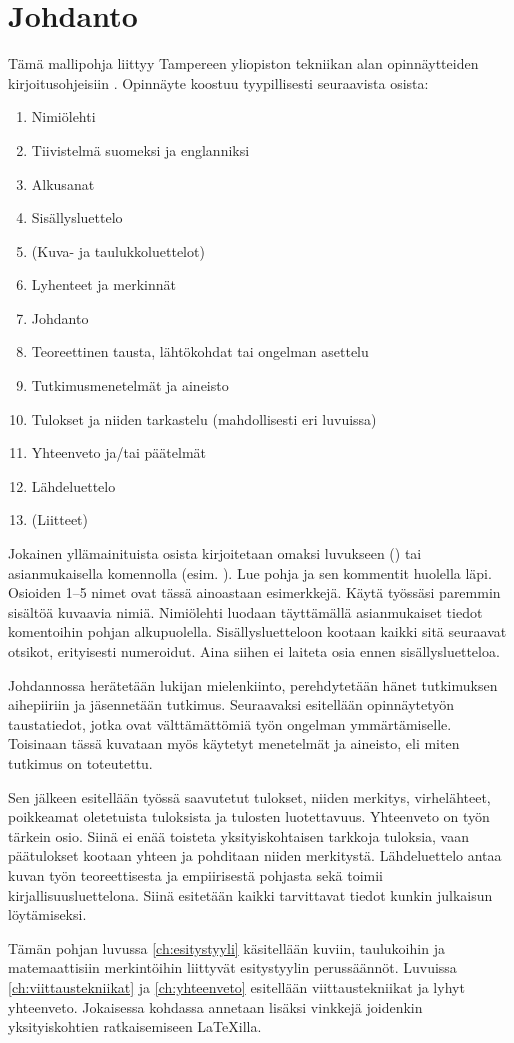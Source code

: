 \chapter{Johdanto}%
\label{ch:johdanto}

Tämä mallipohja liittyy Tampereen yliopiston tekniikan alan opinnäytteiden kirjoitusohjeisiin \parencite{kirjoitusohje2018}. Opinnäyte koostuu tyypillisesti seuraavista osista:

\begin{enumerate}
    \item[] Nimiölehti
    \item[] Tiivistelmä suomeksi ja englanniksi
    \item[] Alkusanat
    \item[] Sisällysluettelo
    \item[] (Kuva- ja taulukkoluettelot)
    \item[] Lyhenteet ja merkinnät
    \item Johdanto
    \item Teoreettinen tausta, lähtökohdat tai ongelman asettelu
    \item Tutkimusmenetelmät ja aineisto
    \item Tulokset ja niiden tarkastelu (mahdollisesti eri luvuissa)
    \item Yhteenveto ja/tai päätelmät
    \item[] Lähdeluettelo
    \item[] (Liitteet)
\end{enumerate}

Jokainen yllämainituista osista kirjoitetaan omaksi luvukseen () tai asianmukaisella komennolla (esim. ). Lue pohja ja sen kommentit huolella läpi. Osioiden 1--5 nimet ovat tässä ainoastaan esimerkkejä. Käytä työssäsi paremmin sisältöä kuvaavia nimiä. Nimiölehti luodaan täyttämällä asianmukaiset tiedot komentoihin pohjan alkupuolella. Sisällysluetteloon kootaan kaikki sitä seuraavat otsikot, erityisesti numeroidut. Aina siihen ei laiteta osia ennen sisällysluetteloa.

Johdannossa herätetään lukijan mielenkiinto, perehdytetään hänet tutkimuksen aihepiiriin ja jäsennetään tutkimus. Seuraavaksi esitellään opinnäytetyön taustatiedot, jotka ovat välttämättömiä työn ongelman ymmärtämiselle. Toisinaan tässä kuvataan myös käytetyt menetelmät ja aineisto, eli miten tutkimus on toteutettu.

Sen jälkeen esitellään työssä saavutetut tulokset, niiden merkitys, virhelähteet, poikkeamat oletetuista tuloksista ja tulosten luotettavuus. Yhteenveto on työn tärkein osio. Siinä ei enää toisteta yksityiskohtaisen tarkkoja tuloksia, vaan päätulokset kootaan yhteen ja pohditaan niiden merkitystä. Lähdeluettelo antaa kuvan työn teoreettisesta ja empiirisestä pohjasta sekä toimii kirjallisuusluettelona. Siinä esitetään kaikki tarvittavat tiedot kunkin julkaisun löytämiseksi.

Tämän pohjan luvussa \ref{ch:esitystyyli} käsitellään kuviin, taulukoihin ja matemaattisiin merkintöihin liittyvät esitystyylin perussäännöt. Luvuissa \ref{ch:viittaustekniikat} ja \ref{ch:yhteenveto} esitellään viittaustekniikat ja lyhyt yhteenveto. Jokaisessa kohdassa annetaan lisäksi vinkkejä joidenkin yksityiskohtien ratkaisemiseen \LaTeX{}illa.
